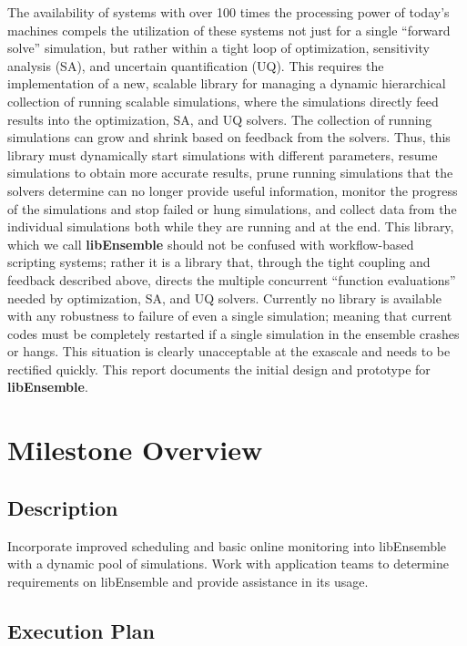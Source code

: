 \documentclass{ecpreport}
\begin{document}
The availability of systems with over 100 times the processing power of today’s 
machines compels the utilization of these systems not just for a single ``forward 
solve'' simulation, but rather within a tight loop of optimization, sensitivity 
analysis (SA), and uncertain quantification (UQ). This requires the implementation 
of a new, scalable library for managing a dynamic hierarchical collection of 
running scalable simulations, where the simulations directly feed results 
into the optimization, SA, and UQ solvers.  The collection of running simulations 
can grow and shrink based on feedback from the solvers. Thus, this library must 
dynamically start simulations with different parameters, resume simulations to 
obtain more accurate results, prune running simulations that the solvers determine 
can no longer provide useful information, monitor the progress of the simulations 
and stop failed or hung simulations, and collect data from the individual 
simulations both while they are running and at the end.  This library, which 
we call {\bf libEnsemble} should not be confused with workflow-based scripting 
systems; rather it is a library that, through the tight coupling and feedback 
described above, directs the multiple concurrent ``function evaluations'' 
needed by optimization, SA, and UQ solvers. Currently no library is available 
with any robustness to failure of even a single simulation; meaning that current
codes must be completely restarted if a single simulation in the ensemble 
crashes or hangs. This situation is clearly unacceptable at the exascale
and needs to be rectified quickly.  This report documents the initial
design and prototype for {\bf libEnsemble}.

\section{Milestone Overview}

\subsection{Description}

 Incorporate improved scheduling and basic online monitoring into libEnsemble 
with a dynamic pool of simulations. Work with application teams to determine 
requirements on libEnsemble and provide assistance in its usage.

\subsection{Execution Plan}
\end{document}
